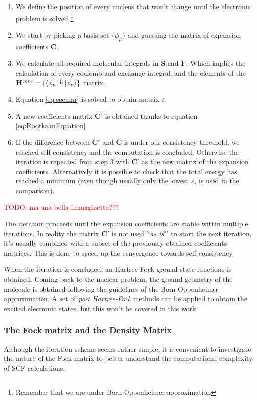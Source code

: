 \documentclass[a4paper,12pt]{article}
\newcommand\mynotes[1]{\begin{flushright}

\textcolor{red}{TODO: #1}\end{flushright}}
\begin{document}
\begin{enumerate}
	\item We define the position of every nucleus that won't change until the electronic problem is solved \footnote{Remember that we are under Born-Oppenheimer approximation}
	\item We start by picking a basis set $\{\phi_{\mu}\}$ and guessing the matrix of expansion coefficients $\mathbf{C}$.
	\item We calculate all required molecular integrals in $\mathbf{S}$ and $\mathbf{F}$. Which implies the calculation of every coulomb and exchange integral, and the elements of the $\mathbf{H}^{core} = \{\bra{\phi_{\mu}}\hat{h}\ket{\phi_{\nu}}\}$ matrix.
	\item Equation \eqref{eq:secular} is solved to obtain matrix $\varepsilon$.
	\item A new coefficients matrix $\mathbf{C'}$ is obtained thanks to equation \eqref{eq:RoothaanEquation}.
	\item If the difference between $\mathbf{C'}$ and $\mathbf{C} $ is under our consistency threshold, we reached self-consistency and the computation is concluded. Otherwise the iteration is repeated from step 3 with $\mathbf{C'}$ as the new matrix of the expansion coefficients. Alternatively it is possible to check that the total energy has reached a minimum (even though usually only the lowest $\varepsilon_i$ is used in the comparison).
\end{enumerate}

\mynotes{ma una bella immaginetta???}

The iteration proceeds until the expansion coefficients are stable within multiple iterations. In reality the matrix $\mathbf{C'}$ is not used ``\textit{as is}"" to start the next iteration, it's usually combined with a subset of the previously obtained coefficients matrices. This is done to speed up the convergence towards self consistency.

When the iteration is concluded, an Hartree-Fock ground state functions is obtained. Coming back to the nuclear problem, the ground geometry of the molecule is obtained following the guidelines of the Born-Oppenheimer approximation.
A set of \textit{post Hartree-Fock} methods can be applied to obtain the excited electronic states, but this won't be covered in this work.

\subsubsection{The Fock matrix and the Density Matrix}\label{sec:FockMatrix}
Although the iteration scheme seems rather simple, it is convenient to investigate the nature of the Fock matrix to better understand the computational complexity of SCF calculations.
\end{document}
